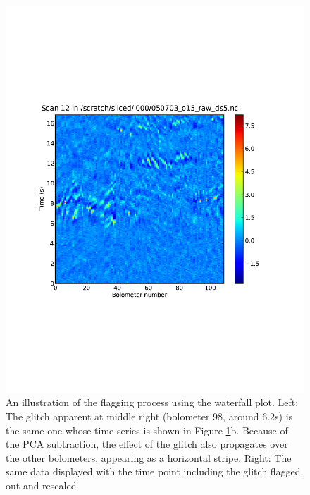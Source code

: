 \documentclass[12pt,preprint]{aastex}
\begin{document}
\begin{figure}
\begin{minipage}{3.25in}
\begin{center}
      \includegraphics[scale=0.5]{flagger_glitchgone}
    \end{center}
  \end{minipage}
  \caption{An illustration of the flagging process using the waterfall plot.
  Left: The glitch apparent at middle right (bolometer 98, around 6.2s) is the
  same one whose time series is shown in Figure \ref{fig:Flagger}b.  Because of
  the PCA subtraction, the effect of the glitch also propagates over the other
  bolometers, appearing as a horizontal stripe. Right: The same data displayed
  with the time point including the glitch flagged out and rescaled}

  \label{fig:Flagger}

  \addtocounter{figure}{-1} 
  \addtocounter{subfig}{1}
  

\end{figure}
\end{document}

